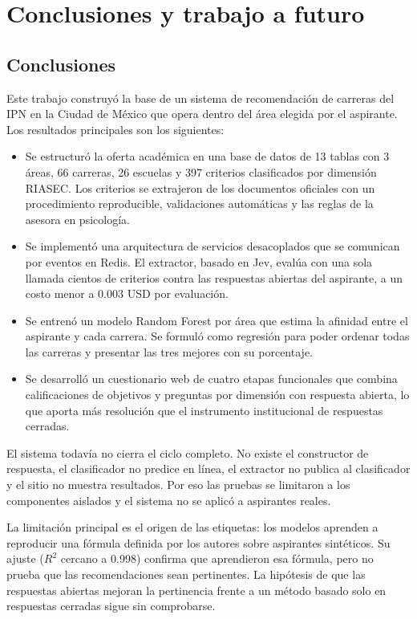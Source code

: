 ﻿\chapter{Conclusiones y trabajo a futuro}

\section*{Conclusiones}
Este trabajo construyó la base de un sistema de recomendación de carreras del IPN en la Ciudad de México que opera dentro del área elegida por el aspirante. Los resultados principales son los siguientes:
\begin{itemize}
    \item Se estructuró la oferta académica en una base de datos de 13 tablas con 3 áreas, 66 carreras, 26 escuelas y 397 criterios clasificados por dimensión RIASEC. Los criterios se extrajeron de los documentos oficiales con un procedimiento reproducible, validaciones automáticas y las reglas de la asesora en psicología.
    \item Se implementó una arquitectura de servicios desacoplados que se comunican por eventos en Redis. El extractor, basado en Jev, evalúa con una sola llamada cientos de criterios contra las respuestas abiertas del aspirante, a un costo menor a 0.003 USD por evaluación.
    \item Se entrenó un modelo Random Forest por área que estima la afinidad entre el aspirante y cada carrera. Se formuló como regresión para poder ordenar todas las carreras y presentar las tres mejores con su porcentaje.
    \item Se desarrolló un cuestionario web de cuatro etapas funcionales que combina calificaciones de objetivos y preguntas por dimensión con respuesta abierta, lo que aporta más resolución que el instrumento institucional de respuestas cerradas.
\end{itemize}

El sistema todavía no cierra el ciclo completo. No existe el constructor de respuesta, el clasificador no predice en línea, el extractor no publica al clasificador y el sitio no muestra resultados. Por eso las pruebas se limitaron a los componentes aislados y el sistema no se aplicó a aspirantes reales.

La limitación principal es el origen de las etiquetas: los modelos aprenden a reproducir una fórmula definida por los autores sobre aspirantes sintéticos. Su ajuste ($R^2$ cercano a 0.998) confirma que aprendieron esa fórmula, pero no prueba que las recomendaciones sean pertinentes. La hipótesis de que las respuestas abiertas mejoran la pertinencia frente a un método basado solo en respuestas cerradas sigue sin comprobarse.

